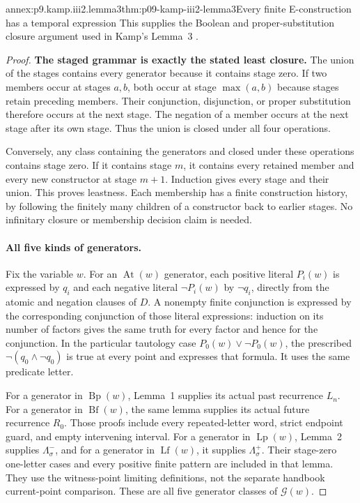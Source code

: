 \begin{annexitem}{annex:p9.kamp.iii2.lemma3}{thm:p09-kamp-iii2-lemma3}{Every finite E-construction has a temporal expression}
This supplies the Boolean and proper-substitution closure argument used in
Kamp's Lemma~3 \cite[ch.~III, pp.~67, 73]{Kamp1968}.

\begin{proof}
\textbf{The staged grammar is exactly the stated least closure.}\enspace
The union of the stages contains every generator because it contains
stage zero. If two members occur at stages \(a,b\), both occur at
stage \(\max(a,b)\) because stages retain preceding members. Their
conjunction, disjunction, or proper substitution therefore occurs at the
next stage. The negation of a member occurs at the next stage after its
own stage. Thus the union is closed under all four operations.

Conversely, any class containing the generators and closed under these
operations contains stage zero. If it contains stage \(m\), it contains
every retained member and every new constructor at stage \(m+1\).
Induction gives every stage and their union. This proves leastness.
Each membership has a finite construction history, by following the
finitely many children of a constructor back to earlier stages. No
infinitary closure or membership decision claim is needed.

\paragraph{All five kinds of generators.}
Fix the variable \(w\). For an \(\operatorname{At}(w)\) generator,
each positive literal \(P_i(w)\) is expressed by \(q_i\) and each
negative literal \(\neg P_i(w)\) by \(\neg q_i\), directly from
the atomic and negation clauses of \(D\). A nonempty finite conjunction
is expressed by the corresponding conjunction of those literal
expressions: induction on its number of factors gives the same truth
for every factor and hence for the conjunction. In the particular
tautology case \(P_0(w)\lor\neg P_0(w)\), the prescribed
\(\neg(q_0\land\neg q_0)\) is true at every point and expresses
that formula. It uses the same predicate letter.

For a generator in \(\operatorname{Bp}(w)\), Lemma~1 supplies its
actual past recurrence \(L_n\). For a generator in
\(\operatorname{Bf}(w)\), the same lemma supplies its actual future
recurrence \(R_0\). Those proofs include every repeated-letter word,
strict endpoint guard, and empty intervening interval.
For a generator in \(\operatorname{Lp}(w)\), Lemma~2 supplies
\(\Lambda^-_\sigma\), and for a generator in
\(\operatorname{Lf}(w)\), it supplies \(\Lambda^+_\sigma\).
Their stage-zero one-letter cases and every positive finite pattern are
included in that lemma. They use the witness-point limiting definitions,
not the separate handbook current-point comparison. These are all five
generator classes of \(\mathcal G(w)\).


\end{proof}
\end{annexitem}
